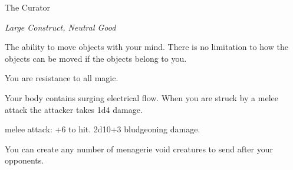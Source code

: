 \begin{monsterbox}{The Curator}
	\begin{hangingpar}
		\textit{Large Construct, Neutral Good}
	\end{hangingpar}
	\dndline%
	\basics[%
	armorclass = 20,
	hitpoints  = 234,
	speed      = 30 ft
	]
	\dndline%
	\stats[
	STR = \stat{24}, %
	DEX = \stat{18},
	CON = \stat{21},
	INT = \stat{30},
	WIS = \stat{16},
	CHA = \stat{20}
	]
	\dndline%
	\details[%
	languages = {All},
	challenge = 10
	]
	\dndline%
	\begin{monsteraction}[Telekinesis]
		The ability to move objects with your mind. There is no limitation to how the objects can be moved if the objects belong to you.
	\end{monsteraction}	
	\begin{monsteraction}
		You are resistance to all magic.
	\end{monsteraction}	
	\begin{monsteraction}
		Your body contains surging electrical flow. When you are struck by a melee attack the attacker takes 1d4 damage.
	\end{monsteraction}
	\begin{monsteraction}
		melee attack: +6 to hit. 2d10+3 bludgeoning damage. 
	\end{monsteraction}
	\begin{monsteraction}
		You can create any number of menagerie void creatures to send after your opponents.
	\end{monsteraction}
\end{monsterbox}

